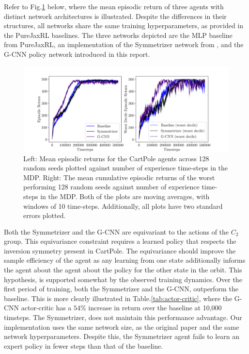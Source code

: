 Refer to Fig.\ref{fig:cp_equi_ac} below, where the mean episodic return of three agents with distinct network architectures is illustrated. Despite the differences in their structures, all networks share the same training hyperparameters, as provided in the PureJaxRL\cite{lu2022discovered} baselines. The three networks depicted are the MLP baseline from PureJaxRL, an implementation of the Symmetrizer network from \cite{vanderpol2020mdp}, and the G-CNN policy network introduced in this report.

\begin{figure}[h!]
	\begin{center}
		\includegraphics[width=\linewidth]{Figures/cart_pole_returns.png}
		\caption{Left: Mean episodic returns for the CartPole agents across 128 random seeds plotted against number of experience time-steps in the MDP. Right: The mean cumulative episodic returns of the worst performing 128 random seeds against number of experience time-steps in the MDP. Both of the plots are moving averages, with windows of 10 time-steps. Additionally, all plots have two standard errors plotted. }
		\label{fig:cp_equi_ac}
	\end{center}
\end{figure}

Both the Symmetrizer and the G-CNN are equivariant to the actions of the $C_2$ group. This equivariance constraint requires a learned policy that respects the inversion symmetry present in CartPole. The equivariance  should improve the sample efficiency of the agent as any learning from one state additionally informs the agent about the agent about the policy for the other state in the orbit. This hypothesis, is supported somewhat by the observed training dynamics. Over the first period of training, both the Symmetrizer and the G-CNN, outperform the baseline. This is more clearly illustrated in Table.\ref{tab:actor-critic}, where the G-CNN actor-critic has a $54\%$ increase in return over the baseline at 10,000 timsteps. The Symmetrizer, does not maintain this performance advantage. Our implementation uses the same network size, as the original paper and the same network hyperparameters. Despite this, the Symmetrizer agent fails to learn an expert policy in fewer steps than that of the baseline.

